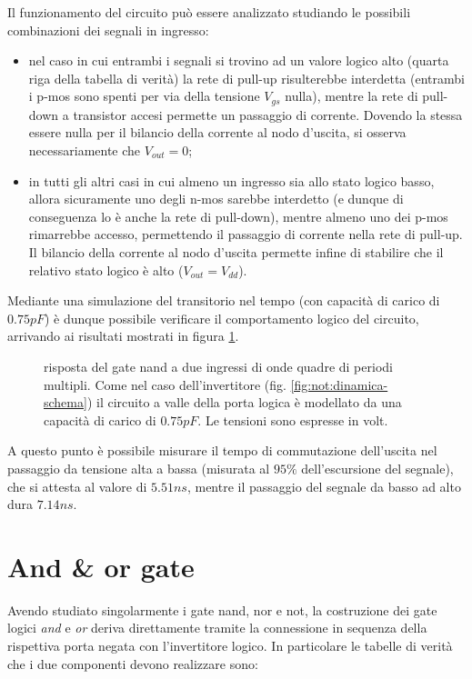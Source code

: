 	Il funzionamento del circuito può essere analizzato studiando le possibili combinazioni dei segnali in ingresso:
	\begin{itemize}
		\item nel caso in cui entrambi i segnali si trovino ad un valore logico alto (quarta riga della tabella di verità) la rete di pull-up risulterebbe interdetta (entrambi i p-mos sono spenti per via della tensione $V_{gs}$ nulla), mentre la rete di pull-down a transistor accesi permette un passaggio di corrente. Dovendo la stessa essere nulla per il bilancio della corrente al nodo d'uscita, si osserva necessariamente che $V_{out} = 0$;
		
		\item in tutti gli altri casi in cui almeno un ingresso sia allo stato logico basso, allora sicuramente uno degli n-mos sarebbe interdetto (e dunque di conseguenza lo è anche la rete di pull-down), mentre almeno uno dei p-mos rimarrebbe accesso, permettendo il passaggio di corrente nella rete di pull-up. Il bilancio della corrente al nodo d'uscita permette infine di stabilire che il relativo stato logico è alto ($V_{out} = V_{dd}$). 
	\end{itemize}

	Mediante una simulazione del transitorio nel tempo (con capacità di carico di $0.75pF$) è dunque possibile verificare il comportamento logico del circuito, arrivando ai risultati mostrati in figura \ref{fig:nand:dinamica}.	

	\begin{figure}[bht]
		\centering
		
		\caption{risposta del gate nand a due ingressi di onde quadre di periodi multipli. Come nel caso dell'invertitore (fig. \ref{fig:not:dinamica-schema}) il circuito a valle della porta logica è modellato da una capacità di carico di $0.75pF$.  Le tensioni sono espresse in volt.}
		\label{fig:nand:dinamica}
	\end{figure}
	
	A questo punto è possibile misurare il tempo di commutazione dell'uscita nel passaggio da tensione alta a bassa (misurata al $95\%$ dell'escursione del segnale), che si attesta al valore di $5.51ns$, mentre il passaggio del segnale da basso ad alto dura $7.14ns$.
	
\section{And \& or gate}
	Avendo studiato singolarmente i gate nand, nor e not, la costruzione dei gate logici \textit{and} e \textit{or} deriva direttamente tramite la connessione in sequenza della rispettiva porta negata con l'invertitore logico. In particolare le tabelle di verità che i due componenti devono realizzare sono:
	
